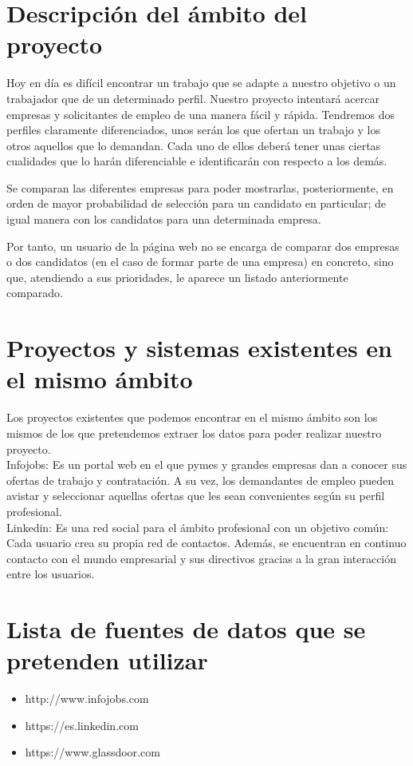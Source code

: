 \section{Descripción del ámbito del proyecto}
Hoy en día es difícil encontrar un trabajo que se adapte a nuestro objetivo o un trabajador que de un determinado perfil. Nuestro proyecto intentará acercar empresas y solicitantes de empleo de una manera fácil y rápida.
Tendremos dos perfiles claramente diferenciados, unos serán los que ofertan un trabajo y los otros aquellos que lo demandan. Cada uno de ellos deberá tener unas ciertas cualidades que lo harán diferenciable e identificarán con respecto a los demás. 

Se comparan las diferentes empresas para poder mostrarlas, posteriormente, en orden de mayor probabilidad de selección para un candidato en particular; de igual manera con los candidatos para una determinada empresa.

Por tanto, un usuario de la página web no se encarga de comparar dos empresas o dos candidatos (en el caso de formar parte de una empresa) en concreto, sino que, atendiendo a sus prioridades, le aparece un listado anteriormente comparado.


\section{Proyectos y sistemas existentes en el mismo ámbito}
Los proyectos existentes que podemos encontrar en el mismo ámbito son los mismos de los que pretendemos extraer los datos para poder realizar nuestro proyecto. \\

Infojobs: Es un portal web en el que pymes y grandes empresas dan a conocer sus ofertas de trabajo y contratación. A su vez, los demandantes de empleo pueden avistar y seleccionar aquellas ofertas que les sean convenientes según su perfil profesional. \\

Linkedin: Es una red social para el ámbito profesional con un objetivo común: Cada usuario crea su propia red de contactos. Además, se encuentran en continuo contacto con el mundo empresarial y sus directivos gracias a la gran interacción entre los usuarios.
	
\section{Lista de fuentes de datos que se pretenden utilizar}
\begin{itemize}
	\item http://www.infojobs.com
	\item https://es.linkedin.com
	\item https://www.glassdoor.com
\end{itemize}	
	


